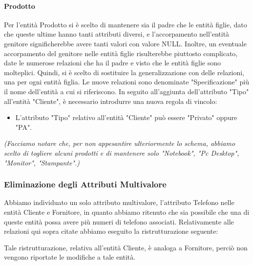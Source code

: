 \paragraph{Prodotto}
Per l'entità Prodotto si è scelto di mantenere sia il padre che le entità figlie, dato che queste ultime hanno tanti attributi diversi, e l'accorpamento nell'entità genitore significherebbe avere tanti valori con valore NULL. Inoltre, un eventuale accorpamento del genitore nelle entità figlie risulterebbe piuttosto complicato, date le numerose relazioni che ha il padre e visto che le entità figlie sono molteplici.
Quindi, si è scelto di sostituire la generalizzazione con delle relazioni, una per ogni entità figlia. Le nuove relazioni sono denominate "Specificazione" più il nome dell'entità a cui si riferiscono.
\newline\newline
In seguito all'aggiunta dell'attributo "Tipo" all'entità "Cliente", è necessario introdurre una nuova regola di vincolo:

\begin{itemize}
  \item L'attributo "Tipo" relativo all'entità "Cliente" può essere "Privato" oppure "PA".
\end{itemize}
\noindent
\textit{(Facciamo notare che, per non appesantire ulteriormente lo schema, abbiamo scelto di togliere alcuni prodotti e di mantenere solo "Notebook", "Pc Desktop", "Monitor", "Stampante".)}



\newpage
\begin{landscape} %



\end{landscape}


\newpage
\subsubsection{Eliminazione degli Attributi Multivalore}

Abbiamo individuato un solo attributo multivalore, l'attributo Telefono nelle entità Cliente e Fornitore, in quanto abbiamo ritenuto che sia possibile che una di queste entità possa avere più numeri di telefono associati.
\newline
Relativamente alle relazioni qui sopra citate abbiamo eseguito la ristrutturazione seguente:
\newline\newline

\noindent{}
\newline\newline
Tale ristrutturazione, relativa all'entità Cliente, è analoga a Fornitore, perciò non vengono riportate le modifiche a tale entità.
